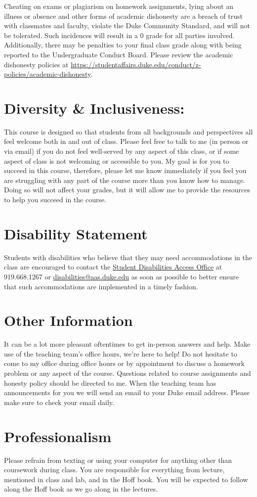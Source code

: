 \documentclass[11pt, a4paper]{article}
\begin{document}
Cheating on exams or plagiarism on homework assignments, lying about an illness or absence and other forms of academic dishonesty are a breach of trust with classmates and faculty, violate the Duke Community Standard, and will not be tolerated. Such incidences will result in a 0 grade for all parties involved. Additionally, there may be penalties to your final class grade along with being reported to the Undergraduate Conduct Board. Please review the academic dishonesty policies at \url{https://studentaffairs.duke.edu/conduct/z-policies/academic-dishonesty}.


\section{Diversity \& Inclusiveness:}
This course is designed so that students from all backgrounds and perspectives all feel welcome both in and out of class. Please feel free to talk to me (in person or via email) if you do not feel well-served by any aspect of this class, or if some aspect of class is not welcoming or accessible to you. My goal is for you to succeed in this course, therefore, please let me know immediately if you feel you are struggling with any part of the course more than you know how to manage. Doing so will not affect your grades, but it will allow me to provide the resources to help you succeed in the course.


\section{Disability Statement} 
Students with disabilities who believe that they may need accommodations in the class are encouraged to contact the \href{https://access.duke.edu/students/staff.php}{Student Disabilities Access Office} at 919.668.1267 or \href{mailto:disabilities@aas.duke.edu}{disabilities@aas.duke.edu}  as soon as possible to better ensure that such accommodations are implemented in a timely fashion.


\section{Other Information} 
It can be a lot more pleasant oftentimes to get in-person answers and help. Make use of the teaching team's office hours, we're here to help! Do not hesitate to come to my office during office hours or by appointment to discuss a homework problem or any aspect of the course.  Questions related to course assignments and honesty policy should be directed to me. When the teaching team has announcements for you we will send an email to your Duke email address. Please make sure to check your email daily.


\section{Professionalism}
Please refrain from texting or using your computer for anything other than coursework during class. You are responsible for everything from lecture, mentioned in class and lab, and in the Hoff book. You will be expected to follow along the Hoff book as we go along in the lectures.
\end{document}
